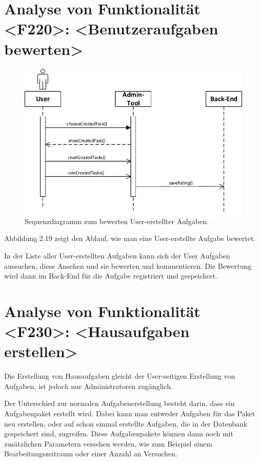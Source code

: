 \section{Analyse von Funktionalität <F220>: <Benutzeraufgaben bewerten>}
\begin{figure}[h]
\centering
\includegraphics[width=1.3\textwidth]{figures/sequenz_F220.pdf}
\caption{Sequenzdiagramm zum bewerten User-erstellter Aufgaben.}
\label{sequence}
\end{figure}
Abbildung 2.19 zeigt den Ablauf, wie man eine User-erstellte Aufgabe bewertet.

In der Liste aller User-erstellten Aufgaben kann sich der User Aufgaben aussuchen, diese Ansehen und sie bewerten und kommentieren. Die Bewertung wird dann im Back-End für die Aufgabe registriert und gespeichert. 

\newpage
\section{Analyse von Funktionalität <F230>: <Hausaufgaben erstellen>}

Die Erstellung von Hausaufgaben gleicht der User-seitigen Erstellung von Aufgaben, ist jedoch nur Administratoren zugänglich.

Der Unterschied zur normalen Aufgabenerstellung besteht darin, dass ein Aufgabenpaket erstellt wird. Dabei kann man entweder Aufgaben für das Paket neu erstellen, oder auf schon einmal erstellte Aufgaben, die in der Datenbank gespeichert sind, zugreifen. Diese Aufgabenpakete können dann noch mit zusätzlichen Parametern versehen werden, wie zum Beispiel einem Bearbeitungszeitraum oder einer Anzahl an Versuchen. 
